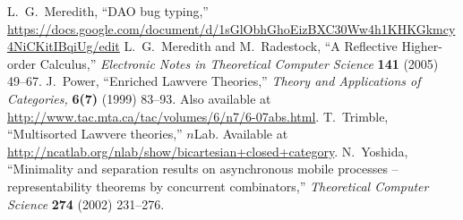 \documentclass[submission,copyright,creativecommons]{eptcs}
\begin{document}
\begin{thebibliography}{99}
 L.\ G.\ Meredith, ``DAO bug typing,'' \href{https://docs.google.com/document/d/1sGlObhGhoEizBXC30Ww4h1KHKGkmcy4NiCKitIBqiUg/edit}{https://docs.google.com/document/d/1sGlObhGhoEizBXC30Ww4h1KHKGkmcy4NiCKitIBqiUg/edit}
 L.\ G.\ Meredith and M.\ Radestock, ``A Reflective Higher-order Calculus,'' {\em Electronic Notes in Theoretical Computer Science} {\bf 141} (2005) 49--67.
 J.\ Power, ``Enriched Lawvere Theories,'' {\em Theory and Applications of Categories,} {\bf 6(7)} (1999) 83--93.  Also available at \href{http://www.tac.mta.ca/tac/volumes/6/n7/6-07abs.html}{http://www.tac.mta.ca/tac/volumes/6/n7/6-07abs.html}.
 T.\ Trimble, ``Multisorted Lawvere theories,'' $n$Lab.  Available at \href{http://ncatlab.org/nlab/show/bicartesian+closed+category}{http://ncatlab.org/nlab/show/bicartesian+closed+category}.
 N.\ Yoshida, ``Minimality and separation results on asynchronous mobile processes – representability theorems by concurrent combinators,'' {\em Theoretical Computer Science} {\bf 274} (2002) 231--276.

\end{thebibliography}
\end{document}
